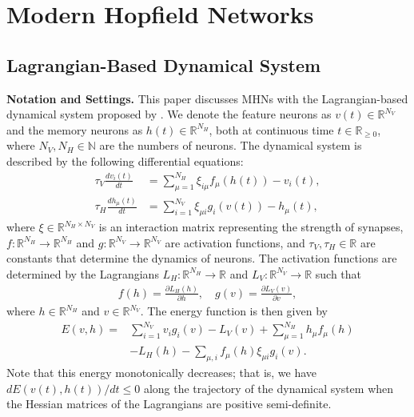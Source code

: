 \newcommand{\Lagh}{L_{H}}
\newcommand{\Lagv}{L_{V}}
\newcommand{\Numh}{N_{H}}
\newcommand{\Numv}{N_{V}}
\newcommand{\tauh}{\tau_{H}}
\newcommand{\tauv}{\tau_{V}}

\section{Modern Hopfield Networks}

\subsection{Lagrangian-Based Dynamical System}
\textbf{Notation and Settings.}
This paper discusses MHNs with the Lagrangian-based dynamical system proposed by \citet{krotov2021large}.
We denote the feature neurons as $v(t) \in \mathbb{R}^{\Numv}$ and the memory neurons as $h(t) \in \mathbb{R}^{\Numh}$, both at continuous time $t \in \mathbb{R}_{\ge 0}$, where $\Numv, \Numh \in \mathbb{N}$ are the numbers of neurons.
The dynamical system is described by the following differential equations:
\begin{align}
\label{eq:de_v}
\tauv \frac{d v_{i}(t)}{d t} &=\sum_{\mu=1}^{\Numh} \xi_{i \mu} f_{\mu}(h(t)) - v_{i}(t),  \\
\label{eq:de_h}
\tauh \frac{d h_\mu(t)}{d t} &=\sum_{i=1}^{\Numv} \xi_{\mu i} g_{i}(v(t)) - h_{\mu}(t),
\end{align}
where $\xi \in \mathbb{R}^{\Numh \times \Numv}$ is an interaction matrix representing the strength of synapses,
$f: \mathbb{R}^{\Numh} \to \mathbb{R}^{\Numh}$ and 
$g: \mathbb{R}^{\Numv} \to \mathbb{R}^{\Numv}$ are activation functions,
and $\tauv, \tauh \in \mathbb{R}$ are constants that determine the dynamics of neurons.
The activation functions are determined by the Lagrangians $\Lagh: \mathbb{R}^{\Numh}\to \mathbb{R}$ and $\Lagv: \mathbb{R}^{\Numv}\to \mathbb{R}$ such that
\begin{align}
f(h) = \frac{\partial \Lagh(h)}{\partial h}, \quad g(v) = \frac{\partial \Lagv(v)}{\partial v},
\end{align}
where $h \in \mathbb{R}^{\Numh}$ and $v \in \mathbb{R}^{\Numv}$.
The energy function is then given by
\begin{align}
E(v, h)
=&
\sum_{i=1}^{\Numv} v_{i} g_{i}(v)
-
\Lagv(v)
+
\sum_{\mu=1}^{\Numh} h_{\mu} f_{\mu}(h)\nonumber \\
&-
\Lagh(h)
-
\sum_{\mu, i} f_{\mu}(h) \xi_{\mu i} g_{i}(v).
\end{align}
Note that this energy monotonically decreases; that is, we have
$dE(v(t),h(t))/dt \leq 0$ along the trajectory of the dynamical system when the Hessian matrices of the Lagrangians are positive semi-definite.

